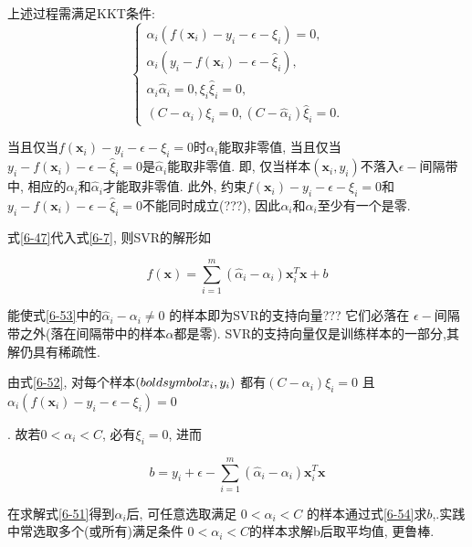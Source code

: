 \documentclass[12pt]{article}
\numberwithin{equation}{section}%
\begin{document}
上述过程需满足KKT条件:
\begin{equation}
 \left\{ \begin{array}{ll}
 \alpha_{i}(f(\boldsymbol{x}_{i}) - y_{i} - \epsilon - \xi_{i})=0, \\
 \hat{\alpha}_{i}(y_{i}-f(\boldsymbol{x}_{i}) - \epsilon - \hat{\xi}_{i}), \\
 \alpha_{i}\hat{\alpha}_{i} = 0, \xi_{i}\hat{\xi}_{i} = 0, \\
 (C - \alpha_{i})\xi_{i} = 0, (C - \hat{\alpha}_{i})\hat{\xi}_{i} = 0.
\end{array} \right.
\label{6-52}
\end{equation}

当且仅当$f(\boldsymbol{x}_{i}) - y_{i} - \epsilon - \xi_{i}=0$时$\alpha_{i}$能取非零值, 当且仅当$y_{i}-f(\boldsymbol{x}_{i}) - \epsilon - \hat{\xi}_{i}=0$是$\hat{\alpha}_{i}$能取非零值. 即, 仅当样本$(\boldsymbol{x}_{i},y_{i})$不落入$\epsilon - $间隔带中, 相应的$\alpha_{i}$和$\hat{\alpha}_{i}$才能取非零值. 此外, 约束$f(\boldsymbol{x}_{i}) - y_{i} - \epsilon - \xi_{i}=0$和$y_{i}-f(\boldsymbol{x}_{i}) - \epsilon - \hat{\xi}_{i}=0$不能同时成立(???), 因此$\alpha_{i}$和$\hat{\alpha}_{i}$至少有一个是零.

式\ref{6-47}代入式\ref{6-7}, 则SVR的解形如

\begin{equation}
f(\boldsymbol{x}) = \sum_{i=1}^{m}(\hat{\alpha}_{i}-\alpha_{i})\boldsymbol{x}_{i}^{T}\boldsymbol{x} + b
\label{6-53}
\end{equation}

能使式\ref{6-53}中的$\hat{\alpha}_{i}-\alpha_{i} \neq 0$ 的样本即为SVR的支持向量??? 它们必落在 $\epsilon - $间隔带之外(落在间隔带中的样本$\alpha$都是零). SVR的支持向量仅是训练样本的一部分,其解仍具有稀疏性. 

由式\ref{6-52}, 对每个样本$(\\boldsymbol{x}_{i}, y_{i})$ 都有$ (C - \alpha_{i})\xi_{i} = 0$ 且  $\alpha_{i}(f(\boldsymbol{x}_{i}) - y_{i} - \epsilon - \xi_{i})=0$ 

. 故若$0 < \alpha_{i} < C$, 必有$\xi_{i} = 0$, 进而

\begin{equation}
b=y_{i}+\epsilon -  \sum_{i=1}^{m}(\hat{\alpha}_{i}-\alpha_{i})\boldsymbol{x}_{i}^{T}\boldsymbol{x}
\label{6-54}
\end{equation}

在求解式\ref{6-51}得到$\alpha_{i}$后, 可任意选取满足 $0 < \alpha_{i} < C$ 的样本通过式\ref{6-54}求$b$,.实践中常选取多个(或所有)满足条件 $0 < \alpha_{i} < C$的样本求解b后取平均值, 更鲁棒.
\end{document}
